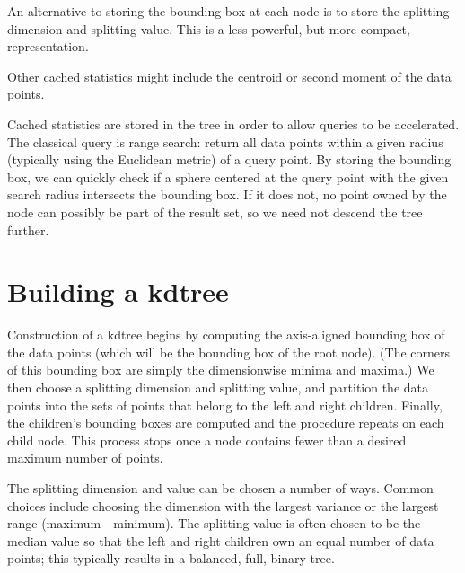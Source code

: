 \documentclass[journal]{IEEEtran}
\begin{document}
An alternative to storing the bounding box at each node is to store the splitting dimension
and splitting value.  This is a less powerful, but more compact, representation.




Other cached statistics might include the centroid or second moment of the data points.


Cached statistics are stored in the tree in order to allow queries to be accelerated.
The classical query is range search: return all data points within a given radius
(typically using the Euclidean metric)
of a query point.  By storing the bounding box, we can quickly check if a sphere centered
at the query point with the given search radius intersects the bounding box.  If it does not,
no point owned by the node can possibly be part of the result set, so we need not descend
the tree further.




\section{Building a kdtree}

Construction of a kdtree begins by computing the axis-aligned bounding box of the 
data points (which will be the bounding box of the root node).
(The corners of this bounding box are simply the dimensionwise minima and maxima.)
We then choose a splitting dimension and splitting value, and partition the data
points into the sets of points that belong to the left and right children.  Finally, the
children's bounding boxes are computed and the procedure repeats on each child node.
This process stops once a node contains fewer than a desired maximum number of points.

The splitting dimension and value can be chosen a number of ways.  Common choices
include choosing the dimension with the largest variance or the largest range
(maximum - minimum).  The splitting value is often chosen to be the median value so
that the left and right children own an equal number of data points; this typically results
in a balanced, full, binary tree.
\end{document}
